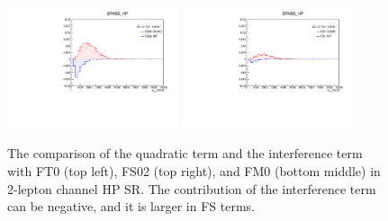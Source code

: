 \begin{figure}[ht]
    \centering
    	\includegraphics[width=0.45\textwidth]{figures/aQGC/FS02_0ptag1pfat0pjet_0ptv_SRVBS_HP_MllJ.pdf}
    	\includegraphics[width=0.45\textwidth]{figures/aQGC/FS1_0ptag1pfat0pjet_0ptv_SRVBS_HP_MllJ.pdf}
        \caption{The comparison of the quadratic term and the interference term with FT0 (top left), FS02 (top right), and FM0 (bottom middle) in 2-lepton channel HP SR. The contribution of the interference term can be negative, and it is larger in FS terms. }
        \label{fig:quadintFS}
\end{figure}
